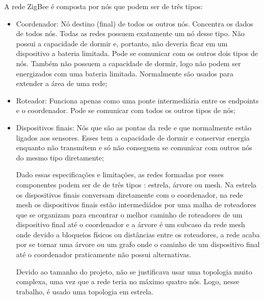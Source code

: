  A rede ZigBee é composta por nós que podem ser de três tipos:
 \begin{itemize}
\item{Coordenador}: Nó destino (final) de todos os outros nós. Concentra os dados de todos nós. Todas as redes possuem exatamente um nó desse tipo. Não possui a capacidade de dormir e, portanto, não deveria ficar em um dispositivo a bateria limitada. Pode se comunicar com os outros dois tipos de nós. Também não possuem a capacidade de dormir, logo não podem ser energizados com uma bateria limitada. Normalmente são usados para extender a área de uma rede;
\item{Roteador}: Funciona apenas como uma ponte intermediária entre os endpoints e o coordenador. Pode se comunicar com todos os outros tipos de nós;
\item{Dispositivos finais}: Nós que são as pontas da rede e que normalmente estão ligados aos sensores. Esses tem a capacidade de dormir e conservar energia enquanto não transmitem e só não conseguem se comunicar com outros nós do mesmo tipo diretamente;

Dado essas especificações e limitações, as redes formadas por esses componentes podem ser de de três tipos \citet{xbee_book}: estrela, árvore ou mesh. Na estrela os dispositivos finais conversam diretamente com o coordenador, na rede mesh os dispositivos finais estão intermediádos por uma malha de roteadores que se organizam para encontrar o melhor caminho de roteadores de um dispositivo final até o coordenador e a árvore é um subcaso da rede mesh onde devido a bloqueios físicos ou distâncias entre os roteadores, a rede acaba por se tornar uma árvore ou um grafo onde o caminho de um dispositivo final até o coordenador praticamente não possui alternativas.

Devido ao tamanho do projeto, não se justificava usar uma topologia muito complexa, uma vez que a rede teria no máximo quatro nós. Logo, nesse trabalho, é usado uma topologia em estrela.
\end{itemize}
